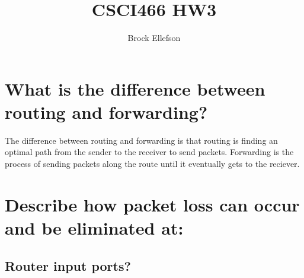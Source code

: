 \documentclass[10pt,letterpaper]{article}
\author{Brock Ellefson}
\title{CSCI466 HW3}
\begin{document}
\maketitle
\section{What is the difference between routing and forwarding?}
The difference between routing and forwarding is that routing is finding an optimal path from the sender to the receiver to send packets. Forwarding is the process of sending packets along the route until it eventually gets to the reciever. 

\section{Describe how packet loss can occur and be eliminated at:}
\subsection{Router input ports?}
\end{document}
